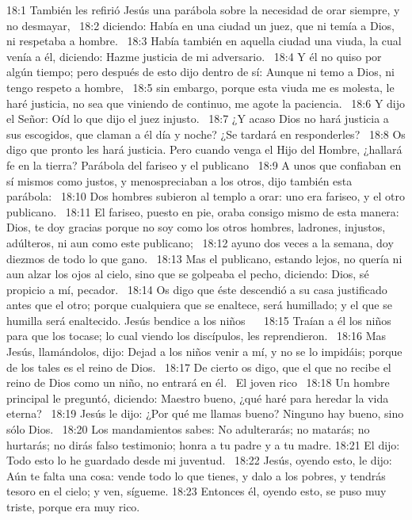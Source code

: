 18:1 También les refirió Jesús una parábola sobre la necesidad de orar siempre, y no desmayar,  
18:2 diciendo: Había en una ciudad un juez, que ni temía a Dios, ni respetaba a hombre.  
18:3 Había también en aquella ciudad una viuda, la cual venía a él, diciendo: Hazme justicia de mi adversario.  
18:4 Y él no quiso por algún tiempo; pero después de esto dijo dentro de sí: Aunque ni temo a Dios, ni tengo respeto a hombre,  
18:5 sin embargo, porque esta viuda me es molesta, le haré justicia, no sea que viniendo de continuo, me agote la paciencia.  
18:6 Y dijo el Señor: Oíd lo que dijo el juez injusto.  
18:7 ¿Y acaso Dios no hará justicia a sus escogidos, que claman a él día y noche? ¿Se tardará en responderles?  
18:8 Os digo que pronto les hará justicia. Pero cuando venga el Hijo del Hombre, ¿hallará fe en la tierra? 
Parábola del fariseo y el publicano  
18:9 A unos que confiaban en sí mismos como justos, y menospreciaban a los otros, dijo también esta parábola:  
18:10 Dos hombres subieron al templo a orar: uno era fariseo, y el otro publicano.  
18:11 El fariseo, puesto en pie, oraba consigo mismo de esta manera: Dios, te doy gracias porque no soy como los otros hombres, ladrones, injustos, adúlteros, ni aun como este publicano;  
18:12 ayuno dos veces a la semana, doy diezmos de todo lo que gano.  
18:13 Mas el publicano, estando lejos, no quería ni aun alzar los ojos al cielo, sino que se golpeaba el pecho, diciendo: Dios, sé propicio a mí, pecador.  
18:14 Os digo que éste descendió a su casa justificado antes que el otro; porque cualquiera que se enaltece, será humillado; y el que se humilla será enaltecido. 
Jesús bendice a los niños    
18:15 Traían a él los niños para que los tocase; lo cual viendo los discípulos, les reprendieron.  
18:16 Mas Jesús, llamándolos, dijo: Dejad a los niños venir a mí, y no se lo impidáis; porque de los tales es el reino de Dios.  
18:17 De cierto os digo, que el que no recibe el reino de Dios como un niño, no entrará en él.  
El joven rico   
18:18 Un hombre principal le preguntó, diciendo: Maestro bueno, ¿qué haré para heredar la vida eterna?  
18:19 Jesús le dijo: ¿Por qué me llamas bueno? Ninguno hay bueno, sino sólo Dios.  
18:20 Los mandamientos sabes: No adulterarás; no matarás; no hurtarás; no dirás falso testimonio; honra a tu padre y a tu madre. 
18:21 El dijo: Todo esto lo he guardado desde mi juventud.  
18:22 Jesús, oyendo esto, le dijo: Aún te falta una cosa: vende todo lo que tienes, y dalo a los pobres, y tendrás tesoro en el cielo; y ven, sígueme. 
18:23 Entonces él, oyendo esto, se puso muy triste, porque era muy rico.  
